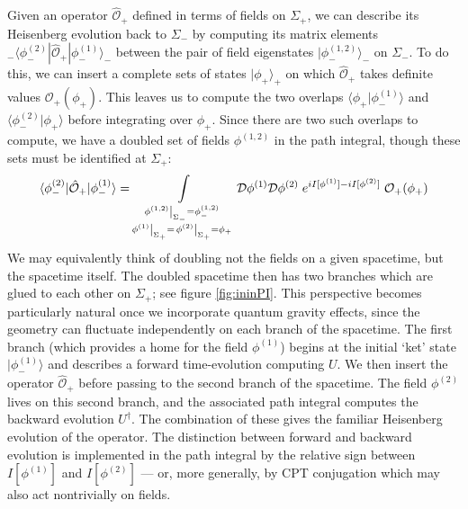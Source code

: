 \documentclass[letterpaper,12pt]{article}
\begin{document}
Given an operator $\hat{\mathcal{O}}_+$ defined in terms of fields on $\Sigma_+$, we can describe its Heisenberg evolution back to $\Sigma_-$ by computing its matrix elements ${}_-\langle \phi^{(2)}_-|\hat{\mathcal{O}}_+|\phi^{(1)}_-\rangle_-$ between the pair of field eigenstates $|\phi^{(1,2)}_-\rangle_-$ on $\Sigma_-$. To do this, we can insert a complete sets of states $|\phi_+\rangle_+$ on which $\hat{\mathcal{O}}_+$ takes definite values $\mathcal{O}_+(\phi_+)$. This leaves us to compute the two overlaps $\langle\phi_+|\phi^{(1)}_-\rangle$ and $\langle\phi^{(2)}_-|\phi_+\rangle$ before integrating over $\phi_+$. Since there are two such overlaps to compute, we have a doubled set of fields $\phi^{(1,2)}$ in the path integral, though these sets must be identified at $\Sigma_+$:
\begin{equation}
	\langle \phi^{(2)}_-|\hat{\mathcal{O}}_+|\phi^{(1)}_-\rangle = \int\displaylimits_{\substack{ {\left.\phi^{(1,2)}\right|_{\Sigma_-} = \phi^{(1,2)}_-} \\ {\left.\phi^{(1)}\right|_{\Sigma_+} = \left.\phi^{(2)}\right|_{\Sigma_+} = \phi_+}}} \mathcal{D}\phi^{(1)} \mathcal{D}\phi^{(2)} \;e^{i I[\phi^{(1)}]-i I[\phi^{(2)}]}\;\mathcal{O}_+(\phi_+)
\end{equation}
We may equivalently think of doubling not the fields on a given spacetime, but the spacetime itself. The doubled spacetime then has two branches which are glued to each other on $\Sigma_+$; see figure \ref{fig:ininPI}. This perspective becomes particularly natural once we incorporate quantum gravity effects, since the geometry can fluctuate independently on each branch of the spacetime. The first branch (which provides a home for the field $\phi^{(1)}$) begins at the initial `ket' state $|\phi^{(1)}_-\rangle$ and describes a forward time-evolution computing $U$. We then insert the operator $\hat{\mathcal{O}}_+$ before passing to the second branch of the spacetime.  The field $\phi^{(2)}$ lives on this second branch, and the associated path integral computes the backward evolution $U^\dag$. The combination of these gives the familiar Heisenberg evolution of the operator. The distinction between forward and backward evolution is implemented in the path integral by the relative sign between $I[\phi^{(1)}]$ and $I[\phi^{(2)}]$ --- or, more generally, by CPT conjugation which may also act nontrivially on fields.
\end{document}

